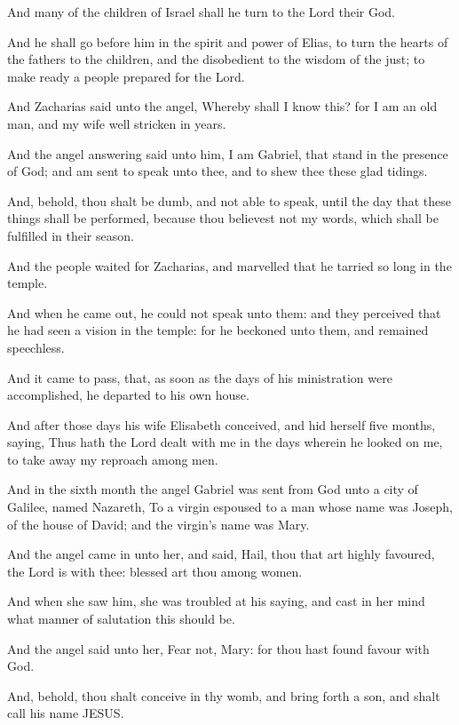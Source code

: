 \verse And many of the children of Israel shall he turn to the Lord their God.

\verse And he shall go before him in the spirit and power of Elias, to turn the hearts of the fathers to the children, and the disobedient to the wisdom of the just; to make ready a people prepared for the Lord.

\verse And Zacharias said unto the angel, Whereby shall I know this? for I am an old man, and my wife well stricken in years.

\verse And the angel answering said unto him, I am Gabriel, that stand in the presence of God; and am sent to speak unto thee, and to shew thee these glad tidings.

\verse And, behold, thou shalt be dumb, and not able to speak, until the day that these things shall be performed, because thou believest not my words, which shall be fulfilled in their season.

\verse And the people waited for Zacharias, and marvelled that he tarried so long in the temple.

\verse And when he came out, he could not speak unto them: and they perceived that he had seen a vision in the temple: for he beckoned unto them, and remained speechless.

\verse And it came to pass, that, as soon as the days of his ministration were accomplished, he departed to his own house.

\verse And after those days his wife Elisabeth conceived, and hid herself five months, saying, \verse Thus hath the Lord dealt with me in the days wherein he looked on me, to take away my reproach among men.

\verse And in the sixth month the angel Gabriel was sent from God unto a city of Galilee, named Nazareth, \verse To a virgin espoused to a man whose name was Joseph, of the house of David; and the virgin's name was Mary.

\verse And the angel came in unto her, and said, Hail, thou that art highly favoured, the Lord is with thee: blessed art thou among women.

\verse And when she saw him, she was troubled at his saying, and cast in her mind what manner of salutation this should be.

\verse And the angel said unto her, Fear not, Mary: for thou hast found favour with God.

\verse And, behold, thou shalt conceive in thy womb, and bring forth a son, and shalt call his name JESUS.

